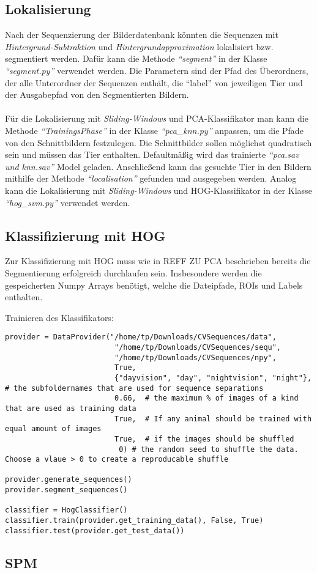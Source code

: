 \subsection*{Lokalisierung}
Nach der Sequenzierung der Bilderdatenbank könnten die Sequenzen mit \textit{Hintergrund-Subtraktion} und \textit{Hintergrundapproximation} lokalisiert bzw. segmentiert werden. Dafür kann die Methode \textit{``segment''} in der Klasse \textit{``segment.py''} verwendet werden.
Die Parametern sind der Pfad des Überordners, der alle Unterordner der Sequenzen enthält, die ``label'' von jeweiligen Tier und der Ausgabepfad von den Segmentierten Bildern.\\\\
Für die Lokalisierung mit \textit{Sliding-Windows} und PCA-Klassifikator man kann die Methode \textit{``TrainingsPhase''} in der Klasse \textit{``pca\_knn.py''} anpassen, um die Pfade von den Schnittbildern festzulegen. Die Schnittbilder sollen möglichst quadratisch sein und müssen das Tier enthalten. Defaultmäßig wird das trainierte \textit{``pca.sav und knn.sav''} Model geladen. Anschließend kann das gesuchte Tier in den Bildern mithilfe der Methode \textit{``localisation''} gefunden und ausgegeben werden. Analog kann die Lokalisierung mit \textit{Sliding-Windows} und HOG-Klassifikator in der Klasse \textit{``hog\_svm.py''} verwendet werden.

\subsection*{Klassifizierung mit HOG}
Zur Klassifizierung mit HOG muss wie in REFF ZU PCA beschrieben bereits die Segmentierung erfolgreich durchlaufen sein. Insbesondere werden die gespeicherten Numpy Arrays benötigt, welche die Dateipfade, ROIs und Labels enthalten.

Trainieren des Klassifikators:


\begin{lstlisting}
provider = DataProvider("/home/tp/Downloads/CVSequences/data",
                         "/home/tp/Downloads/CVSequences/sequ",
                         "/home/tp/Downloads/CVSequences/npy",
                         True,
                         {"dayvision", "day", "nightvision", "night"},  # the subfoldernames that are used for sequence separations
                         0.66,  # the maximum % of images of a kind that are used as training data
                         True,  # If any animal should be trained with equal amount of images
                         True,  # if the images should be shuffled
                          0) # the random seed to shuffle the data. Choose a vlaue > 0 to create a reproducable shuffle

provider.generate_sequences()
provider.segment_sequences()

classifier = HogClassifier()
classifier.train(provider.get_training_data(), False, True)
classifier.test(provider.get_test_data())
\end{lstlisting}



\subsection*{SPM}




